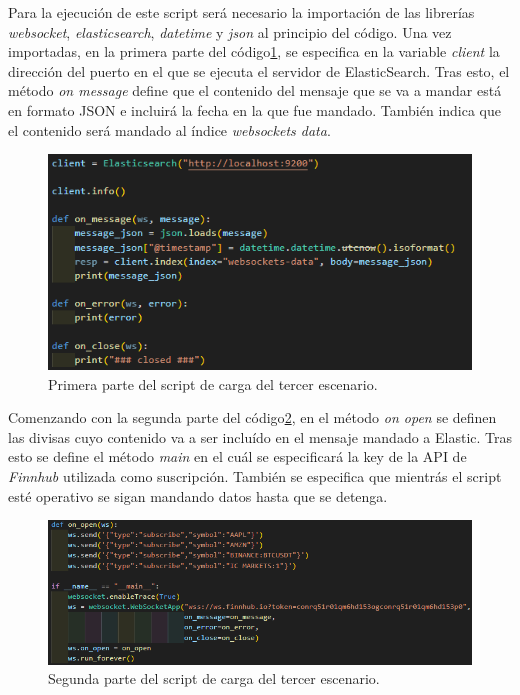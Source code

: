 Para la ejecución de este script será necesario la importación de las librerías \textit{websocket}, \textit{elasticsearch}, \textit{datetime} y \textit{json} al principio del código. Una vez importadas, en la primera parte del código\ref{fig:escenario31}, se especifica en la variable \textit{client} la dirección del puerto en el que se ejecuta el servidor de ElasticSearch. Tras esto, el método \textit{on message} define que el contenido del mensaje que se va a mandar está en formato JSON e incluirá la fecha en la que fue mandado. También indica que el contenido será mandado al índice \textit{websockets data}.
\begin{figure}
    \centering
    \includegraphics[width=1\linewidth]{img/escenario31.png}
    \caption{Primera parte del script de carga del tercer escenario.}
    \label{fig:escenario31}
\end{figure}

Comenzando con la segunda parte del código\ref{fig:escenario32}, en el método \textit{on open} se definen las divisas cuyo contenido va a ser incluído en el mensaje mandado a Elastic. Tras esto se define el método \textit{main} en el cuál se especificará la key de la API de \textit{Finnhub} utilizada como suscripción. También se especifica que mientrás el script esté operativo se sigan mandando datos hasta que se detenga.
\begin{figure}
    \centering
    \includegraphics[width=1\linewidth]{img/escenario32.png}
    \caption{Segunda parte del script de carga del tercer escenario.}
    \label{fig:escenario32}
\end{figure}

